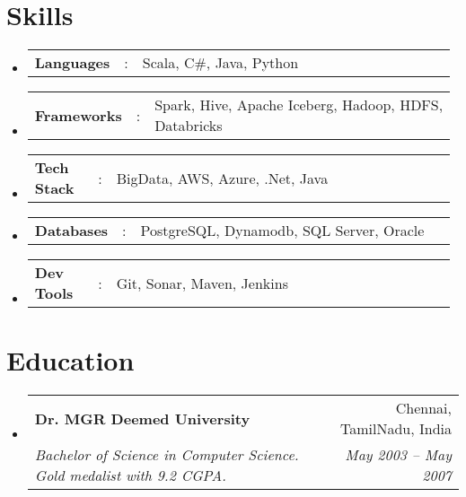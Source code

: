 \documentclass[a4paper,11pt]{article}
\makeatletter
\newcommand{\resumeSectionType}[3]{
  \item\begin{tabular*}{0.96\textwidth}[t]{
    p{0.15\linewidth}p{0.02\linewidth}p{0.81\linewidth}
  }
    \textbf{#1} & #2 & #3
  \end{tabular*}\vspace{-2pt}
}
\newcommand{\resumeQuadHeading}[4]{
  \item
  \begin{tabular*}{0.96\textwidth}[t]{l@{\extracolsep{\fill}}r}
    \textbf{#1} & #2 \\
    \textit{\small#3} & \textit{\small #4} \\
  \end{tabular*}
}
\newcommand{\resumeHeadingListStart}{
  \begin{itemize}[leftmargin=0.15in, label={}]
}
\newcommand{\resumeHeadingListEnd}{\end{itemize}}
\makeatother
\begin{document}


\section{Skills}
  \resumeHeadingListStart{}
    \resumeSectionType{Languages}{:}{Scala, C\#, Java, Python}
    \resumeSectionType{Frameworks}{:}{Spark, Hive, Apache Iceberg, Hadoop, HDFS, Databricks}
    \resumeSectionType{Tech Stack}{:}{BigData, AWS, Azure, .Net, Java}
    \resumeSectionType{Databases}{:}{PostgreSQL, Dynamodb, SQL Server, Oracle}
    \resumeSectionType{Dev Tools}{:}{Git, Sonar, Maven, Jenkins}
  \resumeHeadingListEnd{}



\section{Education}
  \resumeHeadingListStart{}
    \resumeQuadHeading{Dr. MGR Deemed University}{Chennai, TamilNadu, India}
    {Bachelor of Science in Computer Science. Gold medalist with 9.2 CGPA.}{May 2003 -- May 2007}
  \resumeHeadingListEnd{}
\end{document}
